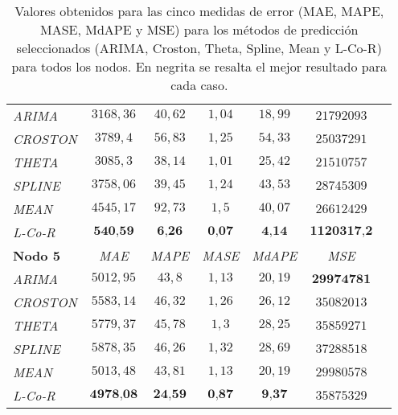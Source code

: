 \documentclass[runningheads]{llncs}
\begin{document}
\begin{table}
\begin{center}
\begin{tabular}{|l|c|c|c|c|c|c|}
\emph{ARIMA } & $3168,36$ & $40,62$ & $1,04$ & $18,99$ & $21792093$ \\%
\emph{CROSTON } & $3789,4$ & $56,83$ & $1,25$ & $54,33$ & $25037291$ \\%
\emph{THETA } & $3085,3$ & $38,14$ & $1,01$ & $25,42$ & $21510757$ \\%
\emph{SPLINE } & $3758,06$ & $39,45$ & $1,24$ & $43,53$ & $28745309$ \\%
\emph{MEAN } & $4545,17$ & $92,73$ & $1,5$ & $40,07$ & $26612429$ \\%
\emph{L-Co-R} & $\textbf{540,59}$ & $\textbf{6,26}$ & $\textbf{0,07}$ & $\textbf{4,14}$ &
$\textbf{1120317,2}$ \\%
\hline 
 \hline 
\textbf{Nodo 5} & \emph{MAE} & \emph{MAPE} & \emph{MASE} & \emph{MdAPE} & \emph{MSE} \\%
\hline

\emph{ARIMA } & $5012,95$ & $43,8$ & $1,13$ & $20,19$ & $\textbf{29974781}$ \\%
\emph{CROSTON } & $5583,14$ & $46,32$ & $1,26$ & $26,12$ & $35082013$ \\%
\emph{THETA } & $5779,37$ & $45,78$ & $1,3$ & $28,25$ & $35859271$ \\%
\emph{SPLINE } & $5878,35$ & $46,26$ & $1,32$ & $28,69$ & $37288518$ \\%
\emph{MEAN } & $5013,48$ & $43,81$ & $1,13$ & $20,19$ & $29980578$ \\%
\emph{L-Co-R} & $\textbf{4978,08}$ & $\textbf{24,59}$ & $\textbf{0,87}$ & $\textbf{9,37}$ &
$35875329$ \\%


\hline

 \end{tabular}
 \end{center}
 \caption{Valores obtenidos para las cinco medidas de error (MAE,
MAPE, MASE, MdAPE y MSE) para los métodos de predicción seleccionados (ARIMA, Croston, Theta,
Spline, Mean y L-Co-R) para todos los nodos. En negrita se resalta el mejor resultado para cada
caso.
 \label{tb:ts-results}}
 \end{table}
\end{document}
